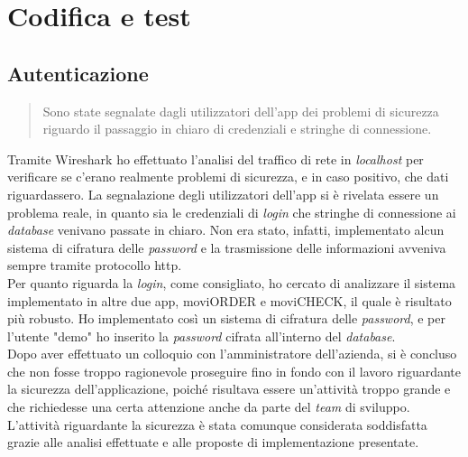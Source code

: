 \chapter{Codifica e test}
\label{cap:codifica}


\section{Autenticazione}

\begin{quote}
    Sono state segnalate dagli utilizzatori dell'app dei problemi di sicurezza riguardo il passaggio in chiaro di credenziali e stringhe di connessione.
\end{quote}

\noindent Tramite Wireshark ho effettuato l'analisi del traffico di rete in \textit{localhost} per verificare se c'erano realmente problemi di sicurezza, e in caso positivo, che dati riguardassero. La segnalazione degli utilizzatori dell'app si è rivelata essere un problema reale, in quanto sia le credenziali di \textit{login} che stringhe di connessione ai \textit{database} venivano passate in chiaro. Non era stato, infatti, implementato alcun sistema di cifratura delle \textit{password} e la trasmissione delle informazioni avveniva sempre tramite protocollo http.\\
Per quanto riguarda la \textit{login}, come consigliato, ho cercato di analizzare il sistema implementato in altre due app, moviORDER e moviCHECK, il quale è risultato più robusto. Ho implementato così un sistema di cifratura delle \textit{password}, e per l'utente "demo" ho inserito la \textit{password} cifrata all'interno del \textit{database}.\\
Dopo aver effettuato un colloquio con l'amministratore dell'azienda, si è concluso che non fosse troppo ragionevole proseguire fino in fondo con il lavoro riguardante la sicurezza dell'applicazione, poiché risultava essere un'attività troppo grande e che richiedesse una certa attenzione anche da parte del \textit{team} di sviluppo. L'attività riguardante la sicurezza è stata comunque considerata soddisfatta grazie alle analisi effettuate e alle proposte di implementazione presentate.

